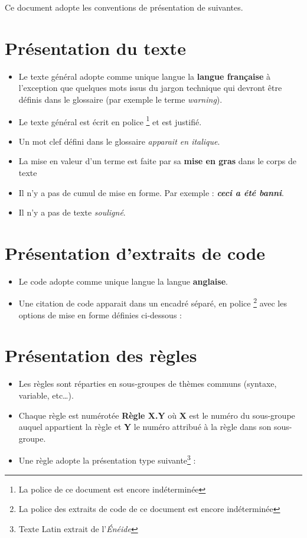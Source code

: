 Ce document adopte les conventions de présentation de suivantes. \medskip

\section{Présentation du texte}

\begin{itemize}
\item Le texte général adopte comme unique langue la \textbf{langue française} à l’exception que quelques mots issus du jargon technique qui devront être définis dans le glossaire (par exemple le terme \textit{warning}).
\item Le texte général est écrit en police \footnote{La police de ce document est encore indéterminée} et est justifié.
\item Un mot clef défini dans le glossaire \textit{apparait en italique}.
\item La mise en valeur d’un terme est faite par sa \textbf{mise en gras} dans le corps de texte
\item Il n’y a pas de cumul de mise en forme. Par exemple : \textbf{\textit{ceci a été banni}}.
\item Il n’y a pas de texte \textsl{souligné}.
\end{itemize}
\bigskip

\section{Présentation d'extraits de code}

\begin{itemize}
\item Le code adopte comme unique langue la langue \textbf{anglaise}.
\item Une citation de code apparait dans un encadré séparé, en police \footnote{La police des extraits de code de ce document est encore indéterminée} avec les options de mise en forme définies ci-dessous :
\end{itemize}


% 
\bigskip

\section{Présentation des règles}

\begin{itemize}
\item Les règles sont réparties en sous-groupes de thèmes communs (syntaxe, variable, etc…).
\item Chaque règle est numérotée \textbf{Règle X.Y} où \textbf{X} est le numéro du sous-groupe auquel appartient la règle et \textbf{Y} le numéro attribué à la règle dans son sous-groupe.
\item Une règle adopte la présentation type suivante\footnote{Texte Latin extrait de l’\textit{Énéide}} :
\end{itemize}

